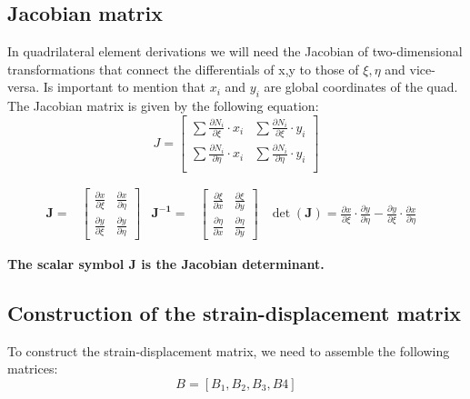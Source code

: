 \documentclass{article}  %
\begin{document}
\subsection{Jacobian matrix}
In quadrilateral element derivations we will need the Jacobian of two-dimensional transformations that connect the differentials of {x,y} to those of {$\xi, \eta$} and vice-versa.
Is important to mention that $x_i$ and $y_i$ are global coordinates of the quad.
The Jacobian matrix is given by the following equation:
\begin{equation}
  J= \begin{bmatrix}
    \sum \frac{\partial N_i}{\partial \xi} \cdot x_i & \sum \frac{\partial N_i}{\partial \xi} \cdot y_i \\
    \sum \frac{\partial N_i}{\partial \eta} \cdot x_i & \sum \frac{\partial N_i}{\partial \eta} \cdot y_i \\
  \end{bmatrix}
\end{equation}



\begin{align}
  \mathbf{J}=
  &  \begin{bmatrix}
    \frac{\partial x}{\partial \xi} & \frac{\partial x}{\partial \eta} \\
    \frac{\partial y}{\partial \xi} & \frac{\partial y}{\partial \eta}
  \end{bmatrix} 
 &
 \mathbf{J^{-1}}=
  &  \begin{bmatrix}
    \frac{\partial \xi}{\partial x} & \frac{\partial \xi}{\partial y} \\
    \frac{\partial \eta}{\partial x} & \frac{\partial \eta}{\partial y}
  \end{bmatrix}
  &
  \det(\mathbf{J}) = 
\frac{\partial x}{\partial \xi} \cdot \frac{\partial y}{\partial \eta} - \frac{\partial y}{\partial \xi} \cdot \frac{\partial x}{\partial \eta}
&
\end{align}

\textbf{The scalar symbol J is the Jacobian determinant.}

\subsection{Construction of the strain-displacement matrix}

To construct the strain-displacement matrix, we need to assemble the following matrices:
\begin{equation}
  B = [B_1, B_2, B_3, B4]
\end{equation}
\end{document}
